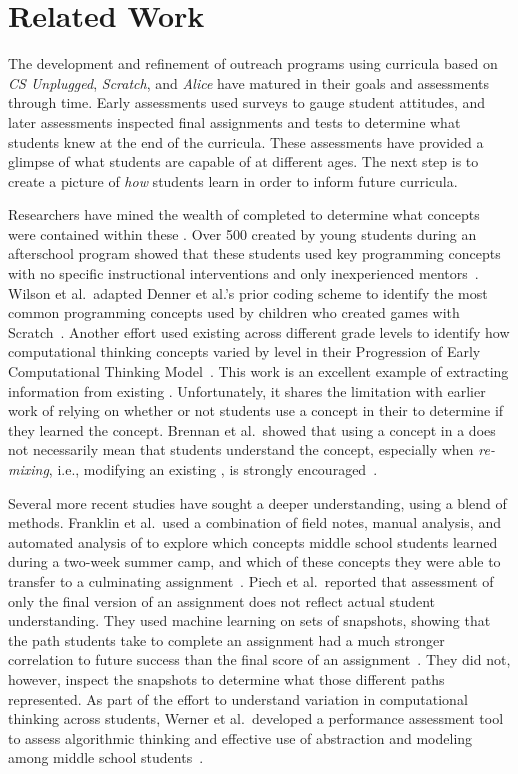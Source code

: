 \section{Related Work}
The development and refinement of outreach programs using curricula based on
\emph{CS Unplugged}, \emph{Scratch}, and \emph{Alice} have matured in their
goals and assessments through time. Early assessments used surveys to gauge
student attitudes, and later assessments inspected final assignments and tests
to determine what students knew at the end of the curricula. These assessments
have provided a glimpse of what students are capable of at different ages. The
next step is to create a picture of \emph{how} students learn in order to
inform future curricula.

Researchers have mined the wealth of completed  to determine what
concepts were contained within these . Over 500 
created by young students during an afterschool program showed that these
students used key programming concepts with no specific instructional
interventions and only inexperienced
mentors~\cite{Maloney:2008:PCU:1352135.1352260}. Wilson et al.\ adapted Denner
et al.'s prior coding scheme to identify the most common programming concepts
used by children who created games with
Scratch~\cite{Denner:2012:CGC:2072695.2073050, wilson12}. Another effort used
existing  across different grade levels to identify how
computational thinking concepts varied by level in their Progression of Early
Computational Thinking Model~\cite{Seiter:2013:MLP:2493394.2493403}. This work
is an excellent example of extracting information from existing
. Unfortunately, it shares the limitation with earlier work of
relying on whether or not students use a concept in their  to
determine if they learned the concept. Brennan et al.\ showed that using a
concept in a \sprogram{} does not necessarily mean that students understand the
concept, especially when \emph{re-mixing}, i.e., modifying an existing
\sprogram{}, is strongly encouraged~\cite{brennan12}.

Several more recent studies have sought a deeper understanding, using a blend
of methods. Franklin et al.\ used a combination of field notes, manual
analysis, and automated analysis of  to explore which concepts
middle school students learned during a two-week summer camp, and which of
these concepts they were able to transfer to a culminating
assignment~\cite{Boe:2013:HLS:2445196.2445265, Franklin:2013:SBO}. Piech et
al.\ reported that assessment of only the final version of an assignment does
not reflect actual student understanding. They used machine learning on sets of
snapshots, showing that the path students take to complete an assignment had a
much stronger correlation to future success than the final score of an
assignment~\cite{Piech:2012:MSL:2157136.2157182}. They did not, however,
inspect the snapshots to determine what those different paths represented. As
part of the effort to understand variation in computational thinking across
students, Werner et al.\ developed a performance assessment tool to assess
algorithmic thinking and effective use of abstraction and modeling among middle
school students~\cite{Werner:2012:FPA:2157136.2157200}.

